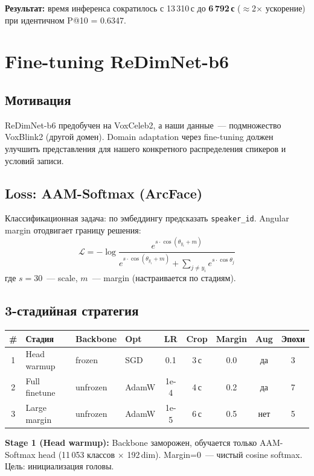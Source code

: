 \documentclass[12pt,a4paper]{article}
\begin{document}
\textbf{Результат:} время инференса сократилось с 13\,310\,с до \textbf{6\,792\,с} ($\approx$2$\times$ ускорение) при идентичном P@10 = 0.6347.

\section{Fine-tuning ReDimNet-b6}

\subsection{Мотивация}

ReDimNet-b6 предобучен на VoxCeleb2, а наши данные~--- подмножество VoxBlink2 (другой домен). Domain adaptation через fine-tuning должен улучшить представления для нашего конкретного распределения спикеров и условий записи.

\subsection{Loss: AAM-Softmax (ArcFace)}

Классификационная задача: по эмбеддингу предсказать \texttt{speaker\_id}. Angular margin отодвигает границу решения:
\[
  \mathcal{L} = -\log \frac{e^{s \cdot \cos(\theta_{y_i} + m)}}{e^{s \cdot \cos(\theta_{y_i} + m)} + \sum_{j \neq y_i} e^{s \cdot \cos\theta_j}}
\]
где $s=30$~--- scale, $m$~--- margin (настраивается по стадиям).

\subsection{3-стадийная стратегия}

\begin{tabular}{c l l l c c c c c}
\hline
\# & Стадия & Backbone & Opt & LR & Crop & Margin & Aug & Эпохи \\
\hline
1 & Head warmup & frozen & SGD & 0.1 & 3\,с & 0.0 & да & 3 \\
2 & Full finetune & unfrozen & AdamW & 1e-4 & 4\,с & 0.2 & да & 7 \\
3 & Large margin & unfrozen & AdamW & 1e-5 & 6\,с & 0.5 & нет & 5 \\
\hline
\end{tabular}

\bigskip
\textbf{Stage 1 (Head warmup):} Backbone заморожен, обучается только AAM-Softmax head (11\,053 классов $\times$ 192\,dim). Margin=0~--- чистый cosine softmax. Цель: инициализация головы.
\end{document}
